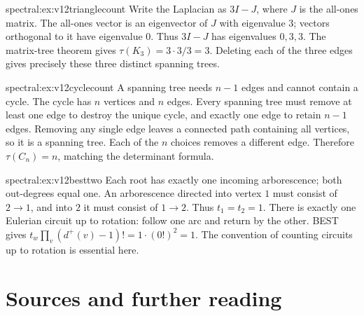 \begin{solution}{spectral:ex:v12trianglecount}
\idea Write the Laplacian as $3I-J$, where $J$ is the all-ones matrix.
\writeup The all-ones vector is an eigenvector of $J$ with eigenvalue $3$; vectors orthogonal to it have eigenvalue $0$. Thus $3I-J$ has eigenvalues $0,3,3$. The matrix-tree theorem gives $\tau(K_3)=3\cdot3/3=3$. Deleting each of the three edges gives precisely these three distinct spanning trees.
\end{solution}

\begin{solution}{spectral:ex:v12cyclecount}
\idea A spanning tree needs $n-1$ edges and cannot contain a cycle.
\writeup The cycle has $n$ vertices and $n$ edges. Every spanning tree must remove at least one edge to destroy the unique cycle, and exactly one edge to retain $n-1$ edges. Removing any single edge leaves a connected path containing all vertices, so it is a spanning tree. Each of the $n$ choices removes a different edge. Therefore $\tau(C_n)=n$, matching the determinant formula.
\end{solution}

\begin{solution}{spectral:ex:v12besttwo}
\idea Each root has exactly one incoming arborescence; both out-degrees equal one.
\writeup An arborescence directed into vertex $1$ must consist of $2\to1$, and into $2$ it must consist of $1\to2$. Thus $t_1=t_2=1$. There is exactly one Eulerian circuit up to rotation: follow one arc and return by the other. BEST gives $t_w\prod_v(d^+(v)-1)!=1\cdot(0!)^2=1$. The convention of counting circuits up to rotation is essential here.
\end{solution}

\section*{Sources and further reading}

